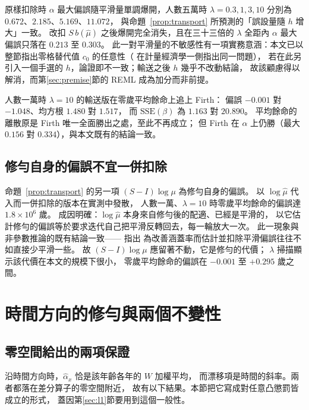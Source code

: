 \documentclass[UTF8, fontset=macnew, a4paper, 12pt]{ctexart}
\begin{document}
原樣扣除時 $\alpha$ 最大偏誤隨平滑量單調爆開，人數五萬時
$\lambda=0.3,1,3,10$ 分別為 $0.672$、$2.185$、$5.169$、$11.072$，
與命題~\ref{prop:transport} 所預測的「誤設量隨 $h$ 增大」一致。
改扣 $S\,b(\hat\mu)$ 之後爆開完全消失，且在三十三倍的 $\lambda$ 全距內
$\alpha$ 最大偏誤只落在 $0.213$ 至 $0.303$。
此一對平滑量的不敏感性有一項實務意涵：本文已以整節指出零格替代值 $c_0$
的任意性（\citealp{chenroth2024} 在計量經濟學一側指出同一問題），
若在此另引入一個手選的 $h$，論證即不一致；輸送之後 $h$ 幾乎不改動結論，
故該顧慮得以解消，而第\ref{sec:premise}節的 REML 成為加分而非前提。

人數一萬時 $\lambda=10$ 的輸送版在零歲平均餘命上追上 Firth：
偏誤 $-0.001$ 對 $-1.048$、均方根 $1.480$ 對 $1.517$，
而 $\mathrm{SSE}(\beta)$ 為 $1.163$ 對 $20.890$。
平均餘命的離散原是 Firth 唯一全面勝出之處，至此不再成立；
但 Firth 在 $\alpha$ 上仍勝（最大 $0.156$ 對 $0.334$），與本文既有的結論一致。

\subsection{修勻自身的偏誤不宜一併扣除}\label{subsec:nosecond}

命題~\ref{prop:transport} 的另一項 $(S-I)\log\mu$ 為修勻自身的偏誤。
以 $\log\hat\mu$ 代入而一併扣除的版本在實測中發散，
人數一萬、$\lambda=10$ 時零歲平均餘命的偏誤達 $1.8\times10^{6}$ 歲。
成因明確：$\log\hat\mu$ 本身來自修勻後的配適、已經是平滑的，
以它估計修勻的偏誤等於要求迭代自己把平滑反轉回去，每一輪放大一次。
此一現象與非參數推論的既有結論一致——\citet{calonico2018} 指出
為改善涵蓋率而估計並扣除平滑偏誤往往不如直接少平滑一些。
故 $(S-I)\log\mu$ 應留著不動，它是修勻的代價；
$\lambda$ 掃描顯示該代價在本文的規模下很小，
零歲平均餘命的偏誤在 $-0.001$ 至 $+0.295$ 歲之間。

\section{時間方向的修勻與兩個不變性}\label{sec:time}

\subsection{零空間給出的兩項保證}\label{subsec:null}

沿時間方向時，$\hat\alpha_x$ 恰是該年齡各年的 $W$ 加權平均，
而漂移項是時間的斜率。兩者都落在差分算子的零空間附近，
故有以下結果。本節把它寫成對任意凸懲罰皆成立的形式，
蓋因第\ref{sec:l1}節要用到這個一般性。
\end{document}
